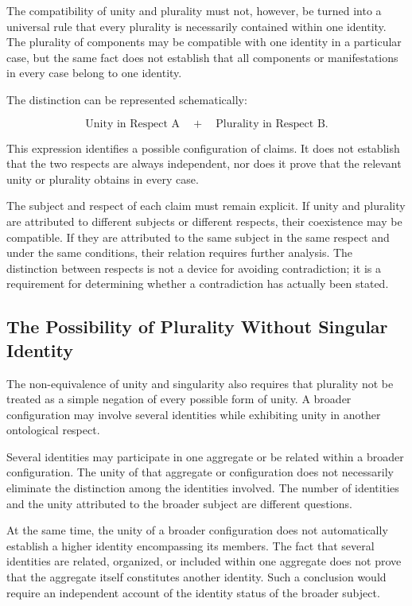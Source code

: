 The compatibility of unity and plurality
must not, however, be turned into a universal
rule that every plurality is necessarily
contained within one identity. The plurality
of components may be compatible with one
identity in a particular case, but the same
fact does not establish that all components
or manifestations in every case belong
to one identity.

The distinction can be represented schematically:

\[
\text{Unity in Respect A}
\quad+\quad
\text{Plurality in Respect B}.
\]

This expression identifies a possible
configuration of claims. It does not
establish that the two respects are always
independent, nor does it prove that the
relevant unity or plurality obtains in
every case.

The subject and respect of each claim
must remain explicit. If unity and plurality
are attributed to different subjects or
different respects, their coexistence may
be compatible. If they are attributed to
the same subject in the same respect and
under the same conditions, their relation
requires further analysis. The distinction
between respects is not a device for
avoiding contradiction; it is a requirement
for determining whether a contradiction
has actually been stated.

\subsection{The Possibility of Plurality Without Singular Identity}

The non-equivalence of unity and singularity
also requires that plurality not be treated
as a simple negation of every possible form
of unity. A broader configuration may
involve several identities while exhibiting
unity in another ontological respect.

Several identities may participate in one
aggregate or be related within a broader
configuration. The unity of that aggregate
or configuration does not necessarily
eliminate the distinction among the identities
involved. The number of identities and
the unity attributed to the broader subject
are different questions.

At the same time, the unity of a broader
configuration does not automatically establish
a higher identity encompassing its members.
The fact that several identities are related,
organized, or included within one aggregate
does not prove that the aggregate itself
constitutes another identity. Such a conclusion
would require an independent account of
the identity status of the broader subject.

